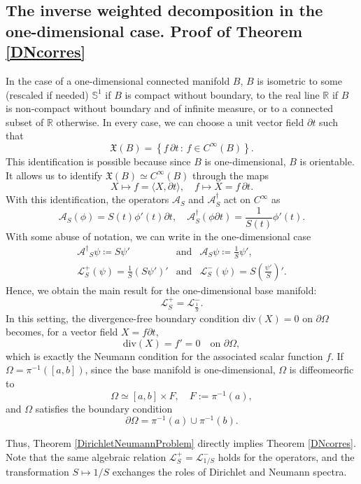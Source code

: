 \documentclass{amsart}
\theoremstyle{definition}
\theoremstyle{remark}
\numberwithin{equation}{section}
\newcommand{\diver}{{{\mathrm{div}}}}
\begin{document}
\subsection{The inverse weighted decomposition in the one-dimensional case. Proof of Theorem \ref{DNcorres}}
In the case of a one-dimensional connected manifold $B$, $B$ is isometric to some (rescaled if needed) $\mathbb S^1$ if $B$ is compact without boundary, to the real line $\mathbb{R}$ if $B$ is non-compact without boundary and of infinite measure, or to a connected subset of $\mathbb R$ otherwise. In every case, we can choose a unit vector field $\partial t$ such that 
$$
\mathfrak{X}(B)=\left\lbrace f\,\partial t\, :\, f\in C^\infty(B) \right\rbrace.
$$
This identification is possible because since $B$ is one-dimensional, $B$ is orientable. It allows us to identify $\mathfrak{X}(B)\simeq C^\infty(B)$ through the maps
$$
X\mapsto f=\langle X,\partial t\rangle,\quad f\mapsto X=f\, \partial t.
$$
With this identification, the operators $\mathcal A_S$ and $\mathcal A_S^\dag$ act on $C^\infty$ as 
$$
\mathcal{A}_S(\phi)=S(t) \phi'(t)\partial t, \quad \mathcal A^\dag_S (\phi \partial t)=\frac{1}{S(t)}\phi'(t).
$$
With some abuse of notation, we can write in the one-dimensional case 
\begin{equation*}
\begin{array}{ccc}
 \mathcal{A^\dag}_S \psi \coloneq S\psi' & \text{and}& \mathcal{A}_S \psi \coloneq \frac{1}{S}\psi',\\
 \mathscr{L}_S^+(\psi)=\frac{1}{S}(S\psi')' & \text{and}&\mathscr{L}_S^-(\psi)=S\left(\frac{\psi'}{S}\right)'.
\end{array}
\end{equation*}
Hence, we obtain the main result for the one-dimensional base manifold:
$$
 \mathscr{L}_S^+= \mathscr{L}_{\frac{1}{S}}^-.
$$
In this setting, the divergence-free boundary condition $\diver(X)=0$ on $\partial\Omega$ becomes, for a vector field $X = f \partial t$,
\[
\diver(X)= f' = 0 \quad \text{on } \partial\Omega,
\]
which is exactly the Neumann condition for the associated scalar function $f$. 
If $\Omega=\pi^{-1}([a,b])$, since the base manifold is one-dimensional, $\Omega$ is diffeomeorfic to
$$
\Omega\simeq [a,b]\times F,\quad F:=\pi^{-1}(a),
$$
and $\Omega$ satisfies the boundary condition
$$
\partial \Omega=\pi^{-1}(a)\cup\pi^{-1}(b).
$$

Thus, Theorem \ref{DirichletNeumannProblem} directly implies Theorem \ref{DNcorres}. Note that the same algebraic relation $\mathscr{L}_S^+= \mathscr{L}_{1/S}^-$ holds for the operators, and the transformation $S\mapsto 1/S$ exchanges the roles of Dirichlet and Neumann spectra.
\end{document}
